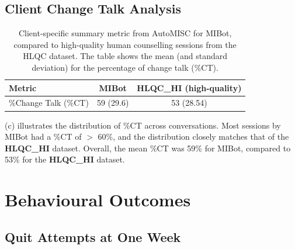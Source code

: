 \subsection{Client Change Talk Analysis}



\begin{table}[ht]
	\centering
	\small
	\setlength{\tabcolsep}{4pt}
	\renewcommand{\arraystretch}{1.1}
	\begin{tabular}{@{}lcc@{}}
		\toprule
		\textbf{Metric}      & \textbf{MIBot} & \textbf{HLQC\_HI (high-quality)} \\
		\midrule
		\%Change Talk (\%CT) & 59 (29.6)      & 53 (28.54)                       \\
		\bottomrule
	\end{tabular}
	\caption[AutoMISC Client Metrics for MIBot vs. Human]{Client-specific summary metric from AutoMISC for MIBot, compared to high-quality human counselling sessions from the HLQC dataset. The table shows the mean (and standard deviation) for the percentage of change talk (\%CT).}
	\label{table:automisc_summary_client}
\end{table}


(c) illustrates the distribution of \%CT across conversations. Most sessions by MIBot had a \%CT of $>$ 60\%, and the distribution closely matches that of the \textbf{HLQC\_HI} dataset. Overall, the mean \%CT was 59\% for MIBot, compared to 53\% for the \textbf{HLQC\_HI} dataset.

\section{Behavioural Outcomes}


\label{sec:behavioural-outcomes}

\subsection*{Quit Attempts at One Week}

